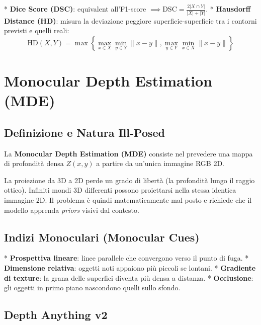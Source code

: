 \documentclass[12pt, a4paper]{report}
\begin{document}
*   \textbf{Dice Score (DSC)}: equivalent all'F1-score $\implies \mathrm{DSC} = \frac{2|X \cap Y|}{|X| + |Y|}$.
*   \textbf{Hausdorff Distance (HD)}: misura la deviazione peggiore superficie-superficie tra
    i contorni previsti e quelli reali:
    \[
      \mathrm{HD}(X, Y) = \max \left\{ \max_{x \in X} \min_{y \in Y} \|x - y\|, \max_{y \in Y} \min_{x \in X} \|x - y\| \right\}
    \]

\chapter{Monocular Depth Estimation (MDE)}

\section{Definizione e Natura Ill-Posed}

La \textbf{Monocular Depth Estimation (MDE)} consiste nel prevedere una mappa di profondità
densa $Z(x,y)$ a partire da un'unica immagine RGB 2D.

\begin{warnbox}
La proiezione da 3D a 2D perde un grado di libertà (la profondità lungo il raggio ottico).
Infiniti mondi 3D differenti possono proiettarsi nella stessa identica immagine 2D.
Il problema è quindi matematicamente mal posto e richiede che il modello apprenda
\emph{priors} visivi dal contesto.
\end{warnbox}

\section{Indizi Monoculari (Monocular Cues)}

*   \textbf{Prospettiva lineare}: linee parallele che convergono verso il punto di fuga.
*   \textbf{Dimensione relativa}: oggetti noti appaiono più piccoli se lontani.
*   \textbf{Gradiente di texture}: la grana delle superfici diventa più densa a distanza.
*   \textbf{Occlusione}: gli oggetti in primo piano nascondono quelli sullo sfondo.

\section{Depth Anything v2}
\end{document}
